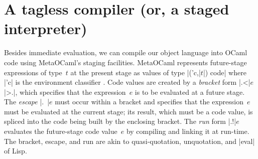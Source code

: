 \section{A tagless compiler (or, a staged interpreter)}\label{compiler}
\vspace{-5pt}
Besides immediate evaluation, we can compile our object language
into OCaml code using MetaOCaml's staging facilities. MetaOCaml
represents future-stage expressions of type~$t$ at the
present stage as values of type |('c,|$t$|) code| where |'c| is the
environment classifier \cite{WalidPOPL03,calcagno-ml-like}. Code values are created
by a \emph{bracket} form |.<|$e$|>.|, which specifies that the expression~$e$ is to be
evaluated at a future stage. The \emph{escape} |.~|$e$ must occur
within a bracket and specifies that the expression~$e$ must be evaluated
at the current stage; its result, which must be a code value, is
spliced into the code being built by the enclosing bracket. The \emph{run} form |.!|$e$ evaluates
the future-stage code value~$e$ by compiling and linking it at run-time.
The bracket, escape, and run are akin to
quasi-quotation, unquotation, and |eval| of Lisp.

